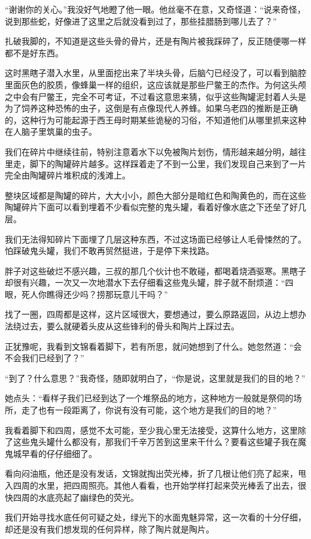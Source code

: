 “谢谢你的关心。”我没好气地瞪了他一眼。他丝毫不在意，又奇怪道：“说来奇怪，说到那些蛇，好像进了这里之后就没看到过了，那些挂腊肠到哪儿去了？”

扎破我脚的，不知道是这些头骨的骨片，还是有陶片被我踩碎了，反正随便哪一样都不是好东西。

这时黑瞎子潜入水里，从里面挖出来了半块头骨，后脑勺已经没了，可以看到脑腔里面灰色的胶质，像蜂巢一样的组织，这应该就是那些尸鳖王的杰作。为何这头颅之中会有尸鳖王，完全不可考证，不过看这意思来猜，似乎这些陶罐泥封着人头是为了饲养这种恐怖的虫子，这倒是有点像现代人养蜂。如果乌老四的推断是正确的，这种行为可能起源于西王母时期某些诡秘的习俗，不知道他们从哪里抓来这种在人脑子里筑巢的虫子。

我们在碎片中继续往前，特别注意着水下以免被陶片划伤，情形越来越分明，越往里走，脚下的陶罐碎片越多。这样踩着走了不到一公里，我们发现自己来到了一片完全由陶罐碎片堆积成的浅滩上。

整块区域都是陶罐的碎片，大大小小，颜色大部分是暗红色和陶黄色的，而在这些陶罐碎片下面可以看到埋着不少看似完整的鬼头罐，看着好像水底之下还垒了好几层。

我们无法得知碎片下面埋了几层这种东西，不过这场面已经够让人毛骨悚然的了。怕踩破鬼头罐，我们不敢再贸然挺进，于是停下来找路。

胖子对这些破烂不感兴趣，三叔的那几个伙计也不敢碰，都喝着烧酒驱寒。黑瞎子却很有兴趣，一次又一次地潜水下去仔细看这些鬼头罐，胖子就不耐烦道：“四眼，死人你瞧得还少吗？捞那玩意儿干吗？”

找了一圈，四周都是这样，这片区域很大，要想通过，要么原路返回，从边上想办法绕过去，要么就硬着头皮从这些锋利的骨头和陶片上踩过去。

正犹豫呢，我看到文锦看着脚下，若有所思，就问她想到了什么。她忽然道：“会不会我们已经到了？”

“到了？什么意思？”我奇怪，随即就明白了，“你是说，这里就是我们的目的地？”

她点头：“看样子我们已经到达了一个堆祭品的地方，这种地方一般就是祭伺的场所，走了也有一段距离了，你说有没有可能，这个地方是我们的目的地？”

我看着脚下和四周，感觉不太可能，至少我心里无法接受，这算什么地方，这里除了这些鬼头罐什么都没有，那我们千辛万苦到这里来干什么？要看这些罐子我在魔鬼城早看的仔仔细细了。

看向闷油瓶，他还是没有发话，文锦就掏出荧光棒，折了几根让他们亮了起来，甩入四周的水里，把四周照亮。其他人看看，也开始学样打起来荧光棒丢了出去，很快四周的水底亮起了幽绿色的荧光。

我们开始寻找水底任何可疑之处，绿光下的水面鬼魅异常，这一次看的十分仔细，却还是没有我们想发现的任何异样，除了陶片就是陶片。

